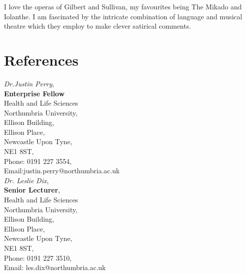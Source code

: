 \documentclass[]{friggeri-cv}
\begin{document}
I love the operas of Gilbert and Sullivan, my favourites being The Mikado and Iolanthe. I am fascinated by the intricate combination of language and musical theatre which they employ to make clever satirical comments.\\





\section{References}
\begin{multicols}{2}
\justify
\emph{Dr.Justin Perry},\\
\textbf{Enterprise Fellow}\\
Health and Life Sciences\\
Northumbria University,\\
Ellison Building,\\
Ellison Place,\\
Newcastle Upon Tyne,\\
NE1 8ST,\\
Phone: 0191 227 3554,\\
Email:justin.perry@northumbria.ac.uk\\

\emph{Dr. Leslie Dix},\\
\textbf{Senior Lecturer},\\
Health and Life Sciences\\
Northumbria University,\\
Ellison Building,\\
Ellison Place,\\
Newcastle Upon Tyne,\\
NE1 8ST,\\
Phone: 0191 227 3510,\\
Email: les.dix@northumbria.ac.uk
\end{multicols}
\end{document}
